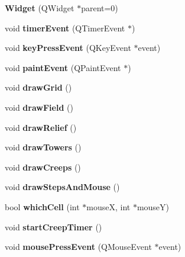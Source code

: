 \begin{DoxyCompactItemize}
\item 
\hypertarget{class_widget_a29531c7f141e461322981b3b579d4590}{}{\bfseries Widget} (Q\+Widget $\ast$parent=0)\label{class_widget_a29531c7f141e461322981b3b579d4590}

\item 
\hypertarget{class_widget_af18765c72725b6f4ba35ca4dccb9bf15}{}void {\bfseries timer\+Event} (Q\+Timer\+Event $\ast$)\label{class_widget_af18765c72725b6f4ba35ca4dccb9bf15}

\item 
\hypertarget{class_widget_a8b3a6948c3fe5e6e2c2f6c0920e66086}{}void {\bfseries key\+Press\+Event} (Q\+Key\+Event $\ast$event)\label{class_widget_a8b3a6948c3fe5e6e2c2f6c0920e66086}

\item 
\hypertarget{class_widget_a3d6bcd20cdc77cafc4944053f1cb0c3e}{}void {\bfseries paint\+Event} (Q\+Paint\+Event $\ast$)\label{class_widget_a3d6bcd20cdc77cafc4944053f1cb0c3e}

\item 
\hypertarget{class_widget_a48b131f3c736e53b3a775483fe5d19d4}{}void {\bfseries draw\+Grid} ()\label{class_widget_a48b131f3c736e53b3a775483fe5d19d4}

\item 
\hypertarget{class_widget_af060ac9b0332b57af1d04189f15c68f1}{}void {\bfseries draw\+Field} ()\label{class_widget_af060ac9b0332b57af1d04189f15c68f1}

\item 
\hypertarget{class_widget_ae472300c4e32fc2e1e7a31d52e4582a7}{}void {\bfseries draw\+Relief} ()\label{class_widget_ae472300c4e32fc2e1e7a31d52e4582a7}

\item 
\hypertarget{class_widget_ab52cba29f9278d5bc6f7224b59b13856}{}void {\bfseries draw\+Towers} ()\label{class_widget_ab52cba29f9278d5bc6f7224b59b13856}

\item 
\hypertarget{class_widget_ac4302f6cb038331f4c0fcd004b933d52}{}void {\bfseries draw\+Creeps} ()\label{class_widget_ac4302f6cb038331f4c0fcd004b933d52}

\item 
\hypertarget{class_widget_ae7772c9065b9c48c4b0116e2f9763b97}{}void {\bfseries draw\+Steps\+And\+Mouse} ()\label{class_widget_ae7772c9065b9c48c4b0116e2f9763b97}

\item 
\hypertarget{class_widget_a1c573b2a2d0ad04ce4a36b3dac112c91}{}bool {\bfseries which\+Cell} (int $\ast$mouse\+X, int $\ast$mouse\+Y)\label{class_widget_a1c573b2a2d0ad04ce4a36b3dac112c91}

\item 
\hypertarget{class_widget_a36a7586e0d1b613182e54166bfcf7fd0}{}void {\bfseries start\+Creep\+Timer} ()\label{class_widget_a36a7586e0d1b613182e54166bfcf7fd0}

\item 
\hypertarget{class_widget_a681594b94d8b48c7e7b669268f3baf81}{}void {\bfseries mouse\+Press\+Event} (Q\+Mouse\+Event $\ast$event)\label{class_widget_a681594b94d8b48c7e7b669268f3baf81}

\end{DoxyCompactItemize}

